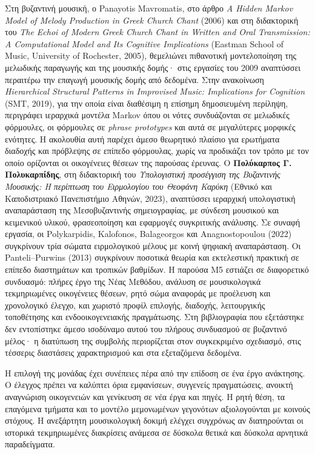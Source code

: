 \documentclass[11pt,a4paper]{article}
\begin{document}
Στη βυζαντινή μουσική, ο Panayotis Mavromatis, στο άρθρο \emph{A Hidden Markov Model of Melody Production in Greek Church Chant} (2006) και στη διδακτορική του \emph{The Echoi of Modern Greek Church Chant in Written and Oral Transmission: A Computational Model and Its Cognitive Implications} (Eastman School of Music, University of Rochester, 2005), θεμελιώνει πιθανοτική μοντελοποίηση της μελωδικής παραγωγής και της μουσικής δομής· στις εργασίες του 2009 αναπτύσσει περαιτέρω την επαγωγή μουσικής δομής από δεδομένα. Στην ανακοίνωση \emph{Hierarchical Structural Patterns in Improvised Music: Implications for Cognition} (SMT, 2019), για την οποία είναι διαθέσιμη η επίσημη δημοσιευμένη περίληψη, περιγράφει ιεραρχικά μοντέλα Markov όπου οι νότες συνδυάζονται σε μελωδικές φόρμουλες, οι φόρμουλες σε \emph{phrase prototypes} και αυτά σε μεγαλύτερες μορφικές ενότητες. Η ακολουθία αυτή παρέχει άμεσο θεωρητικό πλαίσιο για ερωτήματα διαδοχής και πρόβλεψης σε επίπεδο φόρμουλας, χωρίς να προδικάζει τον τρόπο με τον οποίο ορίζονται οι οικογένειες θέσεων της παρούσας έρευνας. Ο \textbf{Πολύκαρπος Γ. Πολυκαρπίδης}, στη διδακτορική του \emph{Υπολογιστική προσέγγιση της Βυζαντινής Μουσικής: Η περίπτωση του Ειρμολογίου του Θεοφάνη Καρύκη} (Εθνικό και Καποδιστριακό Πανεπιστήμιο Αθηνών, 2023), αναπτύσσει ιεραρχική υπολογιστική αναπαράσταση της Μεσοβυζαντινής σημειογραφίας, με σύνδεση μουσικού και κειμενικού υλικού, φρασεοποίηση και εφαρμογές συγκριτικής ανάλυσης. Σε συναφή εργασία, οι Polykarpidis, Kalofonos, Balageorgos και Anagnostopoulou (2022) συγκρίνουν τρία σώματα ειρμολογικού μέλους με κοινή ψηφιακή αναπαράσταση. Οι Panteli--Purwins (2013) συγκρίνουν ποσοτικά θεωρία και εκτελεστική πρακτική σε επίπεδο διαστημάτων και τροπικών βαθμίδων. Η παρούσα M5 εστιάζει σε διαφορετικό συνδυασμό: πλήρες έργο της Νέας Μεθόδου, ανάλυση σε μουσικολογικά τεκμηριωμένες οικογένειες θέσεων, ρητό σώμα αναφοράς με προέλευση και χρονολογικό έλεγχο, και χωριστό προφίλ επιλογής, διαδοχής, λειτουργικής τοποθέτησης και ενδοοικογενειακής πραγμάτωσης. Στη βιβλιογραφία που εξετάστηκε δεν εντοπίστηκε άμεσο ισοδύναμο αυτού του πλήρους συνδυασμού σε βυζαντινό μέλος· η διατύπωση της συμβολής περιορίζεται στον συγκεκριμένο σχεδιασμό, στις τέσσερις διαστάσεις χαρακτηρισμού και στα εξεταζόμενα δεδομένα.


Η επιλογή της μονάδας έχει συνέπειες πέρα από την επίδοση σε ένα έργο ανάκτησης. Ο έλεγχος πρέπει να καλύπτει όρια εμφανίσεων, συγγενείς πραγματώσεις, ανοικτή αναγνώριση οικογενειών και γενίκευση σε νέα έργα και πηγές. Η ρητή θέση, τα επαγόμενα τμήματα και το μοντέλο μεμονωμένων γεγονότων αξιολογούνται με κοινούς στόχους. Η ανεξάρτητη μουσικολογική δοκιμή ελέγχει συγχρόνως αν διατηρούνται οι ιστορικά τεκμηριωμένες διακρίσεις ανάμεσα σε δύσκολα θετικά και δύσκολα αρνητικά παραδείγματα.
\end{document}
